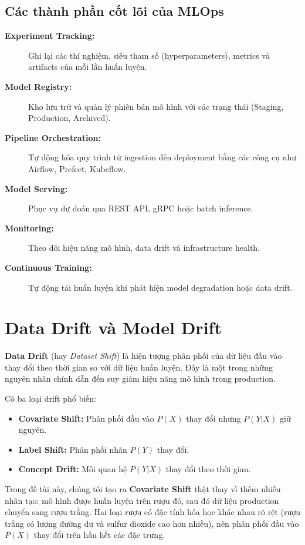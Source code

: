 \documentclass[12pt,a4paper]{report}
\begin{document}
\subsection{Các thành phần cốt lõi của MLOps}

\begin{description}
  \item[\textbf{Experiment Tracking:}] Ghi lại các thí nghiệm, siêu tham số (hyperparameters), metrics và artifacts của mỗi lần huấn luyện.
  \item[\textbf{Model Registry:}] Kho lưu trữ và quản lý phiên bản mô hình với các trạng thái (Staging, Production, Archived).
  \item[\textbf{Pipeline Orchestration:}] Tự động hóa quy trình từ ingestion đến deployment bằng các công cụ như Airflow, Prefect, Kubeflow.
  \item[\textbf{Model Serving:}] Phục vụ dự đoán qua REST API, gRPC hoặc batch inference.
  \item[\textbf{Monitoring:}] Theo dõi hiệu năng mô hình, data drift và infrastructure health.
  \item[\textbf{Continuous Training:}] Tự động tái huấn luyện khi phát hiện model degradation hoặc data drift.
\end{description}

\section{Data Drift và Model Drift}

\textbf{Data Drift} (hay \textit{Dataset Shift}) là hiện tượng phân phối của dữ liệu đầu vào thay đổi theo thời gian so với dữ liệu huấn luyện. Đây là một trong những nguyên nhân chính dẫn đến suy giảm hiệu năng mô hình trong production.

Có ba loại drift phổ biến:
\begin{itemize}
  \item \textbf{Covariate Shift:} Phân phối đầu vào $P(X)$ thay đổi nhưng $P(Y|X)$ giữ nguyên.
  \item \textbf{Label Shift:} Phân phối nhãn $P(Y)$ thay đổi.
  \item \textbf{Concept Drift:} Mối quan hệ $P(Y|X)$ thay đổi theo thời gian.
\end{itemize}

Trong đề tài này, chúng tôi tạo ra \textbf{Covariate Shift} thật thay vì thêm nhiễu nhân tạo: mô hình được huấn luyện trên rượu đỏ, sau đó dữ liệu production chuyển sang rượu trắng. Hai loại rượu có đặc tính hóa học khác nhau rõ rệt (rượu trắng có lượng đường dư và sulfur dioxide cao hơn nhiều), nên phân phối đầu vào $P(X)$ thay đổi trên hầu hết các đặc trưng.
\end{document}
